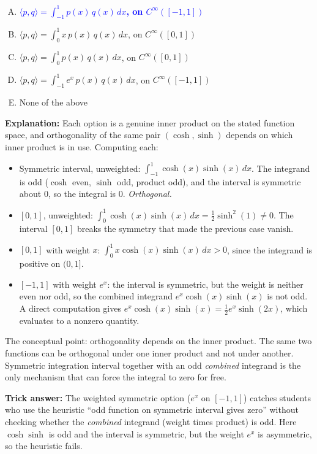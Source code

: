 \documentclass[12pt]{amsart}
\begin{document}
\begin{enumerate}[(A)]
\item \textcolor{blue}{\textbf{$\displaystyle \langle p, q \rangle = \int_{-1}^{1} p(x)\, q(x)\, dx$, on $C^\infty([-1,1])$}}
\item $\displaystyle \langle p, q \rangle = \int_{0}^{1} x\, p(x)\, q(x)\, dx$, on $C^\infty([0,1])$
\item $\displaystyle \langle p, q \rangle = \int_{0}^{1} p(x)\, q(x)\, dx$, on $C^\infty([0,1])$
\item $\displaystyle \langle p, q \rangle = \int_{-1}^{1} e^{x}\, p(x)\, q(x)\, dx$, on $C^\infty([-1,1])$
\item None of the above
\end{enumerate}

\textbf{Explanation:}
Each option is a genuine inner product on the stated function space, and
orthogonality of the same pair $(\cosh, \sinh)$ depends on which inner
product is in use. Computing each:
\begin{itemize}
\item Symmetric interval, unweighted: $\int_{-1}^{1} \cosh(x)\sinh(x)\, dx$. The integrand is odd ($\cosh$ even, $\sinh$ odd, product odd), and the interval is symmetric about $0$, so the integral is $0$. \emph{Orthogonal.}
\item $[0,1]$, unweighted: $\int_{0}^{1} \cosh(x)\sinh(x)\, dx = \tfrac{1}{2}\sinh^2(1) \neq 0$. The interval $[0,1]$ breaks the symmetry that made the previous case vanish.
\item $[0,1]$ with weight $x$: $\int_{0}^{1} x \cosh(x)\sinh(x)\, dx > 0$, since the integrand is positive on $(0,1]$.
\item $[-1,1]$ with weight $e^x$: the interval is symmetric, but the weight is neither even nor odd, so the combined integrand $e^x \cosh(x) \sinh(x)$ is not odd. A direct computation gives $e^x \cosh(x)\sinh(x) = \tfrac{1}{2} e^x \sinh(2x)$, which evaluates to a nonzero quantity.
\end{itemize}

The conceptual point: orthogonality depends on the inner product. The same
two functions can be orthogonal under one inner product and not under another.
Symmetric integration interval together with an odd \emph{combined} integrand
is the only mechanism that can force the integral to zero for free.

\textbf{Trick answer:}
The weighted symmetric option ($e^x$ on $[-1,1]$) catches students who use
the heuristic ``odd function on symmetric interval gives zero'' without
checking whether the \emph{combined} integrand (weight times product) is
odd. Here $\cosh \sinh$ is odd and the interval is symmetric, but the
weight $e^x$ is asymmetric, so the heuristic fails.
\end{document}

